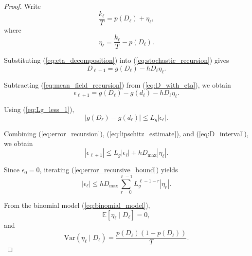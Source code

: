 \documentclass[10pt]{iopart}
\newcommand{\1}{\mathbf{1}}
\begin{document}
\begin{proof}
Write
\begin{equation}
\frac{k_\ell}{T}
=
p(D_\ell)+\eta_\ell,
\label{eq:eta_decomposition}
\end{equation}
where
\begin{equation}
\eta_\ell
=
\frac{k_\ell}{T}-p(D_\ell).
\label{eq:eta_def}
\end{equation}

Substituting (\ref{eq:eta_decomposition}) into (\ref{eq:stochastic_recursion}) gives
\begin{equation}
D_{\ell+1}
=
g(D_\ell)-hD_\ell\eta_\ell.
\label{eq:D_with_eta}
\end{equation}

Subtracting (\ref{eq:mean_field_recursion}) from (\ref{eq:D_with_eta}), we obtain
\begin{equation}
\epsilon_{\ell+1}
=
g(D_\ell)-g(d_\ell)
-
hD_\ell\eta_\ell.
\label{eq:error_recursion}
\end{equation}

Using (\ref{eq:Lg_less_1}),
%
\begin{equation}
|g(D_\ell)-g(d_\ell)|
\le
L_g|\epsilon_\ell|.
\label{eq:lipschitz_estimate}
\end{equation}

Combining (\ref{eq:error_recursion}), (\ref{eq:lipschitz_estimate}), and (\ref{eq:D_interval}), we obtain
\begin{equation}
|\epsilon_{\ell+1}|
\le
L_g|\epsilon_\ell|
+
hD_{\max}|\eta_\ell|.
\label{eq:error_recursive_bound}
\end{equation}

Since $\epsilon_0=0$,  iterating (\ref{eq:error_recursive_bound}) yields
%
\begin{equation}
|\epsilon_\ell|
\le
hD_{\max}
\sum_{r=0}^{\ell-1}
L_g^{\ell-1-r}
|\eta_r|.
\label{eq:error_series}
\end{equation}

From the binomial model (\ref{eq:binomial_model}),
\begin{equation}
\mathbb E[\eta_\ell\mid D_\ell]=0,
\label{eq:eta_mean}
\end{equation}
and
\begin{equation}
\mathrm{Var}(\eta_\ell\mid D_\ell)
=
\frac{p(D_\ell)(1-p(D_\ell))}{T}.
\label{eq:eta_variance}
\end{equation}


\end{proof}
\end{document}
